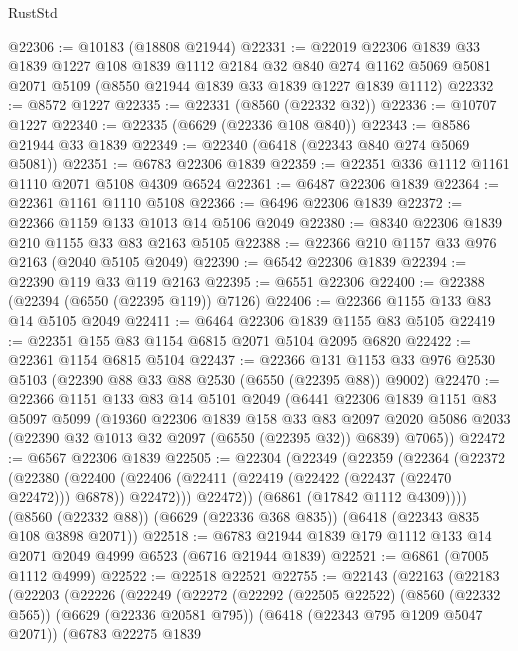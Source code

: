 \begin{lexlean}{RustStd}
\begin{coremodule}
@22306 := @10183 (@18808 @21944)
@22331 := @22019
    @22306
    @1839
    @33
    @1839
    @1227
    @108
    @1839
    @1112
    @2184
    @32
    @840
    @274
    @1162
    @5069
    @5081
    @2071
    @5109
    (@8550 @21944 @1839 @33 @1839 @1227 @1839 @1112)
@22332 := @8572 @1227
@22335 := @22331 (@8560 (@22332 @32))
@22336 := @10707 @1227
@22340 := @22335 (@6629 (@22336 @108 @840))
@22343 := @8586 @21944 @33 @1839
@22349 := @22340 (@6418 (@22343 @840 @274 @5069 @5081))
@22351 := @6783 @22306 @1839
@22359 := @22351 @336 @1112 @1161 @1110 @2071 @5108 @4309 @6524
@22361 := @6487 @22306 @1839
@22364 := @22361 @1161 @1110 @5108
@22366 := @6496 @22306 @1839
@22372 := @22366 @1159 @133 @1013 @14 @5106 @2049
@22380 := @8340 @22306 @1839 @210 @1155 @33 @83 @2163 @5105
@22388 := @22366 @210 @1157 @33 @976 @2163 (@2040 @5105 @2049)
@22390 := @6542 @22306 @1839
@22394 := @22390 @119 @33 @119 @2163
@22395 := @6551 @22306
@22400 := @22388 (@22394 (@6550 (@22395 @119)) @7126)
@22406 := @22366 @1155 @133 @83 @14 @5105 @2049
@22411 := @6464 @22306 @1839 @1155 @83 @5105
@22419 := @22351 @155 @83 @1154 @6815 @2071 @5104 @2095 @6820
@22422 := @22361 @1154 @6815 @5104
@22437 := @22366
    @131
    @1153
    @33
    @976
    @2530
    @5103
    (@22390 @88 @33 @88 @2530 (@6550 (@22395 @88)) @9002)
@22470 := @22366
    @1151
    @133
    @83
    @14
    @5101
    @2049
    (@6441
      @22306
      @1839
      @1151
      @83
      @5097
      @5099
      (@19360
        @22306
        @1839
        @158
        @33
        @83
        @2097
        @2020
        @5086
        @2033
        (@22390 @32 @1013 @32 @2097 (@6550 (@22395 @32)) @6839)
        @7065))
@22472 := @6567 @22306 @1839
@22505 := @22304
    (@22349
      (@22359
        (@22364
          (@22372
            (@22380
              (@22400 (@22406 (@22411 (@22419 (@22422 (@22437 (@22470 @22472))) @6878)) @22472)))
            @22472))
        (@6861 (@17842 @1112 @4309))))
    (@8560 (@22332 @88))
    (@6629 (@22336 @368 @835))
    (@6418 (@22343 @835 @108 @3898 @2071))
@22518 := @6783 @21944 @1839 @179 @1112 @133 @14 @2071 @2049 @4999 @6523 (@6716 @21944 @1839)
@22521 := @6861 (@7005 @1112 @4999)
@22522 := @22518 @22521
@22755 := @22143
    (@22163
      (@22183
        (@22203
          (@22226
            (@22249
              (@22272
                (@22292
                  (@22505 @22522)
                  (@8560 (@22332 @565))
                  (@6629 (@22336 @20581 @795))
                  (@6418 (@22343 @795 @1209 @5047 @2071))
                  (@6783
                    @22275
                    @1839

\end{coremodule}
\end{lexlean}

